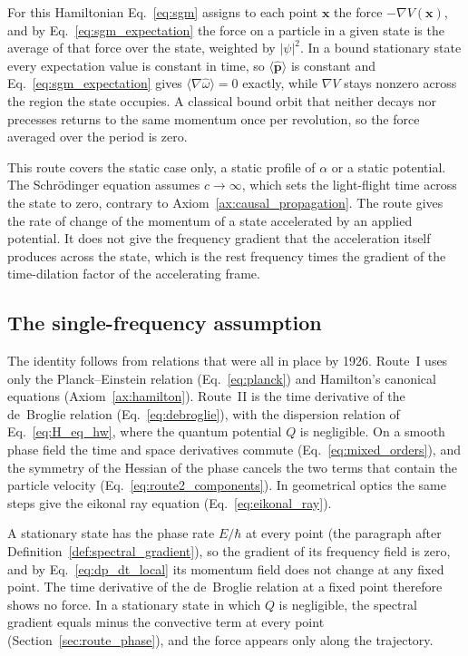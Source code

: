 \documentclass[aps,prd,onecolumn,tightenlines,nofootinbib,notitlepage,11pt,floatfix]{revtex4-2}
\theoremstyle{indentedtheorem}
\begin{document}
For this Hamiltonian Eq.~\eqref{eq:sgm} assigns to each point $\mathbf{x}$ the force $-\nabla V(\mathbf{x})$, and by Eq.~\eqref{eq:sgm_expectation} the force on a particle in a given state is the average of that force over the state, weighted by $|\psi|^2$. In a bound stationary state every expectation value is constant in time, so $\langle\hat{\mathbf{p}}\rangle$ is constant and Eq.~\eqref{eq:sgm_expectation} gives $\langle\nabla\hat{\omega}\rangle=0$ exactly, while $\nabla V$ stays nonzero across the region the state occupies. A classical bound orbit that neither decays nor precesses returns to the same momentum once per revolution, so the force averaged over the period is zero.

This route covers the static case only, a static profile of $\alpha$ or a static potential. The Schr\"odinger equation assumes $c\to\infty$, which sets the light-flight time across the state to zero, contrary to Axiom~\ref{ax:causal_propagation}. The route gives the rate of change of the momentum of a state accelerated by an applied potential. It does not give the frequency gradient that the acceleration itself produces across the state, which is the rest frequency times the gradient of the time-dilation factor of the accelerating frame.

\subsection{The single-frequency assumption}
\label{sec:single_frequency}

The identity follows from relations that were all in place by 1926. Route~I uses only the Planck--Einstein relation (Eq.~\eqref{eq:planck}) and Hamilton's canonical equations (Axiom~\ref{ax:hamilton}). Route~II is the time derivative of the de~Broglie relation (Eq.~\eqref{eq:debroglie}), with the dispersion relation of Eq.~\eqref{eq:H_eq_hw}, where the quantum potential $Q$ is negligible. On a smooth phase field the time and space derivatives commute (Eq.~\eqref{eq:mixed_orders}), and the symmetry of the Hessian of the phase cancels the two terms that contain the particle velocity (Eq.~\eqref{eq:route2_components}). In geometrical optics the same steps give the eikonal ray equation (Eq.~\eqref{eq:eikonal_ray}).

A stationary state has the phase rate $E/\hbar$ at every point (the paragraph after Definition~\ref{def:spectral_gradient}), so the gradient of its frequency field is zero, and by Eq.~\eqref{eq:dp_dt_local} its momentum field does not change at any fixed point. The time derivative of the de~Broglie relation at a fixed point therefore shows no force. In a stationary state in which $Q$ is negligible, the spectral gradient equals minus the convective term at every point (Section~\ref{sec:route_phase}), and the force appears only along the trajectory.
\end{document}
